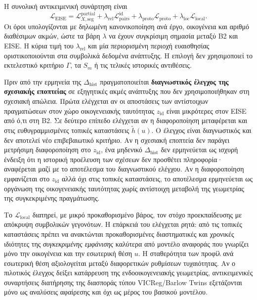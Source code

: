 \documentclass[11pt,a4paper]{article}
\begin{document}
Η συνολική αντικειμενική συνάρτηση είναι
\[
\mathcal L_{\mathrm{EISE}}
=\mathcal L_{X,\mathrm{seg}}^{\mathrm{partial}}
+\lambda_{\mathrm{rel}}\mathcal L_{\mathrm{pairs}}^{\mathrm{id}}
+\lambda_{\mathrm{proto}}\mathcal L_{\mathrm{proto}}
+\lambda_{\mathrm{loc}}\mathcal L_{\mathrm{local}}.
\]
Οι όροι υπολογίζονται με δηλωμένη κανονικοποίηση ανά έργο, οικογένεια και αριθμό διαθέσιμων ακμών, ώστε τα βάρη $\lambda$ να έχουν συγκρίσιμη σημασία μεταξύ B2 και EISE. Η κύρια τιμή του $\lambda_{\mathrm{rel}}$ και μία περιορισμένη περιοχή ευαισθησίας οριστικοποιούνται στα συμβολικά δεδομένα ανάπτυξης. Η επιλογή δεν χρησιμοποιεί το εκτελεστικό κριτήριο $\Gamma$, τα $S_m$ ή τις τελικές ιστορικές αντιθέσεις.

Πριν από την ερμηνεία της $\Delta_{\mathrm{hist}}$ πραγματοποιείται \textbf{διαγνωστικός έλεγχος της σχεσιακής εποπτείας} σε εξηγητικές ακμές ανάπτυξης που δεν χρησιμοποιήθηκαν στη σχεσιακή απώλεια. Πρώτα ελέγχεται αν οι αποστάσεις των αντίστοιχων πραγματώσεων στον χώρο οικογενειακής ταυτότητας $z_{\mathrm{id}}$ είναι μικρότερες στον EISE από ό,τι στη B2. Σε δεύτερο επίπεδο ελέγχεται αν η διαφοροποίηση μεταφέρεται και στις ευθυγραμμισμένες τοπικές καταστάσεις $\widetilde h(u)$. Ο έλεγχος είναι διαγνωστικός και δεν αποτελεί νέο επιβεβαιωτικό κριτήριο. Αν η σχεσιακή εποπτεία δεν παράγει μετρήσιμη διαφοροποίηση στο $z_{\mathrm{id}}$, ένα μηδενικό $\Delta_{\mathrm{hist}}$ δεν ερμηνεύεται ως ισχυρή ένδειξη ότι η ιστορική προέλευση των σχέσεων δεν προσθέτει πληροφορία· αναφέρεται μαζί με το αποτέλεσμα του διαγνωστικού ελέγχου. Αν η διαφοροποίηση εμφανίζεται στο $z_{\mathrm{id}}$ αλλά όχι στις τοπικές καταστάσεις, το αποτέλεσμα ερμηνεύεται ως οργάνωση της οικογενειακής ταυτότητας χωρίς αντίστοιχη μεταβολή της γεωμετρίας της συγκεκριμένης πραγμάτωσης.

Το $\mathcal L_{\mathrm{local}}$ διατηρεί, με μικρό προκαθορισμένο βάρος, τον στόχο προεκπαίδευσης με απόκρυψη συμβολικών γεγονότων. Η επάρκειά του ελέγχεται ρητά: από τις τοπικές καταστάσεις πρέπει να ανακτώνται προκαθορισμένες διαστηματικές και χρονικές ιδιότητες της \emph{συγκεκριμένης εμφάνισης} καλύτερα από μοντέλο αναφοράς που γνωρίζει μόνο την οικογένεια και την εσωτερική θέση $u$. Η σταθερότητα των προφίλ ανά εσωτερική θέση αξιολογείται μεταξύ διαφορετικών ρυθμίσεων τυχαιότητας. Αν ο πιλοτικός έλεγχος δείξει κατάρρευση της ενδοοικογενειακής γεωμετρίας, αντικειμενικές συναρτήσεις διατήρησης της διασποράς τύπου VICReg/Barlow Twins εξετάζονται μόνο ως αναλύσεις αφαίρεσης και όχι ως μέρος του βασικού μοντέλου.
\end{document}
